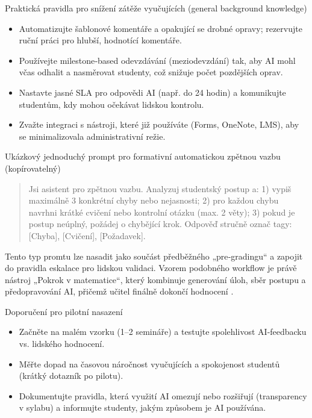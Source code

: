 \documentclass{report}%
\begin{document}
Praktická pravidla pro snížení zátěže vyučujících (general background knowledge)
\begin{itemize}
  \item Automatizujte šablonové komentáře a opakující se drobné opravy; rezervujte ruční práci pro hlubší, hodnotící komentáře.
  \item Používejte milestone‑based odevzdávání (meziodevzdání) tak, aby AI mohl včas odhalit a nasměrovat studenty, což snižuje počet pozdějších oprav.
  \item Nastavte jasné SLA pro odpovědi AI (např. do 24 hodin) a komunikujte studentům, kdy mohou očekávat lidskou kontrolu.
  \item Zvažte integraci s nástroji, které již používáte (Forms, OneNote, LMS), aby se minimalizovala administrativní režie.
\end{itemize}

Ukázkový jednoduchý prompt pro formativní automatickou zpětnou vazbu (kopírovatelný)
\begin{quote}
\begin{PromptBlock}


Jsi asistent pro zpětnou vazbu. Analyzuj studentský postup a: 1) vypiš maximálně 3 konkrétní chyby nebo nejasnosti; 2) pro každou chybu navrhni krátké cvičení nebo kontrolní otázku (max. 2 věty); 3) pokud je postup neúplný, požádej o chybějící krok. Odpověď stručně označ tagy: [Chyba], [Cvičení], [Požadavek].
\end{PromptBlock}


\end{quote}
Tento typ promtu lze nasadit jako součást předběžného „pre‑gradingu“ a zapojit do pravidla eskalace pro lidskou validaci. Vzorem podobného workflow je právě nástroj „Pokrok v matematice“, který kombinuje generování úloh, sběr postupu a předopravování AI, přičemž učitel finálně dokončí hodnocení \cite{kb_ai_101_tipu_pdf_04e4a115_page_8_1}.

Doporučení pro pilotní nasazení
\begin{itemize}
  \item Začněte na malém vzorku (1–2 semináře) a testujte spolehlivost AI‑feedbacku vs. lidského hodnocení.
  \item Měřte dopad na časovou náročnost vyučujících a spokojenost studentů (krátký dotazník po pilotu).
  \item Dokumentujte pravidla, která využití AI omezují nebo rozšiřují (transparency v sylabu) a informujte studenty, jakým způsobem je AI používána.
\end{itemize}
\end{document}
